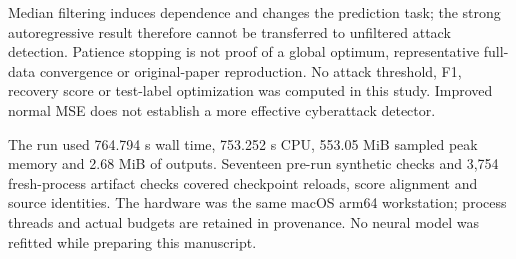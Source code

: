 Median filtering induces dependence and changes the prediction task; the strong autoregressive result therefore cannot be transferred to unfiltered attack detection. Patience stopping is not proof of a global optimum, representative full-data convergence or original-paper reproduction. No attack threshold, F1, recovery score or test-label optimization was computed in this study. Improved normal MSE does not establish a more effective cyberattack detector.

The run used 764.794 s wall time, 753.252 s CPU, 553.05 MiB sampled peak memory and 2.68 MiB of outputs. Seventeen pre-run synthetic checks and 3,754 fresh-process artifact checks covered checkpoint reloads, score alignment and source identities. The hardware was the same macOS arm64 workstation; process threads and actual budgets are retained in provenance. No neural model was refitted while preparing this manuscript.
